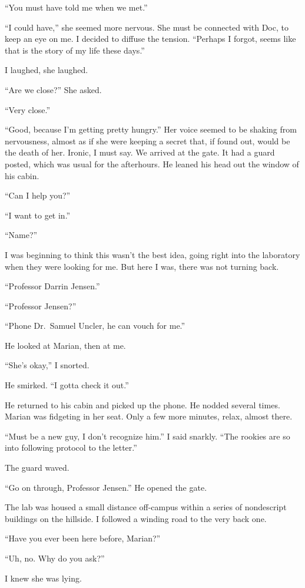 ``You must have told me when we met.''

``I could have,'' she seemed more nervous. She must be connected with
Doc, to keep an eye on me. I decided to diffuse the tension. ``Perhaps I
forgot, seems like that is the story of my life these days.''

I laughed, she laughed.

``Are we close?'' She asked.

``Very close.''

``Good, because I'm getting pretty hungry.'' Her voice seemed to be
shaking from nervousness, almost as if she were keeping a secret that,
if found out, would be the death of her. Ironic, I must say. We arrived
at the gate. It had a guard posted, which was usual for the afterhours.
He leaned his head out the window of his cabin.

``Can I help you?''

``I want to get in.''

``Name?''

I was beginning to think this wasn't the best idea, going right into the
laboratory when they were looking for me. But here I was, there was not
turning back.

``Professor Darrin Jensen.''

``Professor Jensen?''

``Phone Dr.~Samuel Uncler, he can vouch for me.''

He looked at Marian, then at me.

``She's okay,'' I snorted.

He smirked. ``I gotta check it out.''

He returned to his cabin and picked up the phone. He nodded several
times. Marian was fidgeting in her seat. Only a few more minutes, relax,
almost there.

``Must be a new guy, I don't recognize him.'' I said snarkly. ``The
rookies are so into following protocol to the letter.''

The guard waved.

``Go on through, Professor Jensen.'' He opened the gate.

The lab was housed a small distance off-campus within a series of
nondescript buildings on the hillside. I followed a winding road to the
very back one.

``Have you ever been here before, Marian?''

``Uh, no. Why do you ask?''

I knew she was lying.

